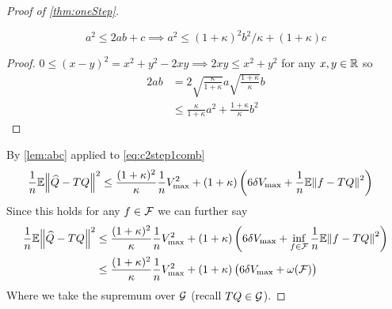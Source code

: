 \begin{proof}[Proof of \cref{thm:oneStep}]
\begin{lem}
    \[ a^2 \leq 2ab + c \implies a^2 \leq (1 + \kappa)^2 b^2 / \kappa
    + (1 + \kappa) c \]
    \label{lem:abc}
  \end{lem}
  \begin{proof} $0 \leq (x - y)^2 = x^2 + y^2 - 2xy \implies 2xy \leq x^2 + y^2$
    for any $x, y \in \mathbb{R}$ so
    \begin{align*}
      2ab & = 2 \sqrt{\frac{\kappa}{1+\kappa}} a \sqrt{\frac{1+\kappa}{\kappa}} b
      \\ & \leq \frac{\kappa}{1+\kappa} a^2 + \frac{1 + \kappa}{\kappa} b^2
    \end{align*}
  \end{proof}
  By \cref{lem:abc} applied to \cref{eq:c2step1comb}
  \begin{align}
    \frac{1}{n} \mathbb{E} \norm{\widehat{Q} - TQ}^2
    & \leq \frac{(1+\kappa)^2}{\kappa} \frac{1}{n} V_{\max}^2
    + (1 + \kappa) \left( 6 \delta V_{\max}
    + \frac{1}{n} \mathbb{E} \norm{f - TQ}^2 \right)
    \label{eq:c2step1final0}
  \end{align}
  Since this holds for any $f \in \mathcal{F}$ we can further say
  \begin{align}
    \frac{1}{n} \mathbb{E} \norm{\widehat{Q} - TQ}^2
    & \leq \frac{(1+\kappa)^2}{\kappa} \frac{1}{n} V_{\max}^2
    + (1 + \kappa) \left( 6 \delta V_{\max}
      + \inf_{f \in \mathcal{F}}
    \frac{1}{n} \mathbb{E} \norm{f - TQ}^2 \right)
    \\ & \leq \frac{(1+\kappa)^2}{\kappa} \frac{1}{n} V_{\max}^2
    + (1 + \kappa) \left( 6 \delta V_{\max}
    + \omega(\mathcal{F}) \right)
    \label{eq:c2step1final}
  \end{align}
  Where we take the supremum over $\mathcal{G}$ (recall $TQ \in \mathcal{G}$).


\end{proof}
